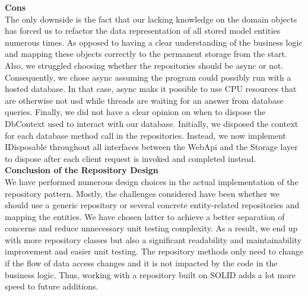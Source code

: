 \textbf{Cons}\\
The only downside is the fact that our lacking knowledge on the domain objects
has forced us to refactor the data representation of all stored model entities numerous
times. As opposed to having a clear understanding of the business logic
and mapping these objects correctly to the permanent storage from the start.
Also, we struggled choosing whether the repositories should be async or not.
Consequently, we chose async assuming the program could possibly run with a
hosted database. In that case, async maks it possible to use CPU resources that
are otherwise not usd while threads are waiting for an answer from database
queries. Finally, we did not have a clear opinion on when to dispose the DbContext
used to interact with our database. Initially, we disposed the context for
each database method call in the repositories. Instead, we now implement IDisposable
throughout all interfaces between the WebApi and the Storage layer to
dispose after each client request is invoked and completed instead.\\

\textbf{Conclusion of the Repository Design}\\
We have performed numerous design choices in the actual implementation of
the repository pattern. Mostly, the challenges considered have been whether we
should use a generic repository or several concrete entity-related repositories
and mapping the entities. We have chosen latter to achieve a better separation of concerns
and reduce unnecessary unit testing complexity. As a result, we end up
with more repository classes but also a significant readability and maintainability
improvement and easier unit testing. The repository methods only need to
change if the flow of data access changes and it is not impacted by the code in
the business logic. Thus, working with a repository built on SOLID adds a lot
more speed to future additions. 